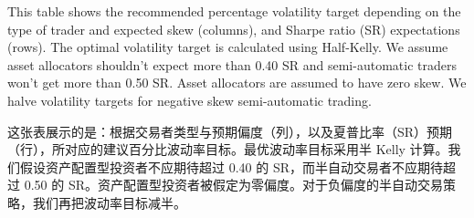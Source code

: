 \begin{bilingualtableblock} \begingroup \small \centering
{}
\par \endgroup \end{bilingualtableblock}

\begin{englishblock} This table shows the recommended percentage volatility target depending on the type of trader and expected skew (columns), and Sharpe ratio (SR) expectations (rows). The optimal volatility target is calculated using Half-Kelly. We assume asset allocators shouldn’t expect more than 0.40 SR and semi-automatic traders won’t get more than 0.50 SR. Asset allocators are assumed to have zero skew. We halve volatility targets for negative skew semi-automatic trading. \end{englishblock}

\begin{chineseblock}这张表展示的是：根据交易者类型与预期偏度（列），以及夏普比率（SR）预期（行），所对应的建议百分比波动率目标。最优波动率目标采用半 Kelly 计算。我们假设资产配置型投资者不应期待超过 0.40 的 SR，而半自动交易者不应期待超过 0.50 的 SR。资产配置型投资者被假定为零偏度。对于负偏度的半自动交易策略，我们再把波动率目标减半。\end{chineseblock}

